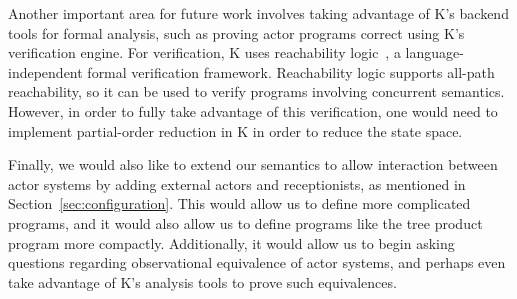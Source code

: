 \documentclass{llncs}
\begin{document}
Another important area for future work involves taking advantage of K's
backend tools for formal analysis, such as proving actor programs correct using
K's verification engine. For verification, K uses reachability logic~\cite{reachabilitylogic}, a
language-independent formal verification framework. Reachability logic supports
all-path reachability, so it can be used to verify programs involving concurrent
semantics. However, in order to fully take advantage of this verification, one
would need to implement partial-order reduction in K in order to reduce the
state space.

Finally, we would also like to extend our semantics to allow interaction between
actor systems by adding external actors and receptionists, as mentioned in
Section~\ref{sec:configuration}. This would allow us to define more complicated
programs, and it would also allow us to define programs like the tree product
program more compactly. Additionally, it would allow us to begin asking
questions regarding observational equivalence of actor systems, and perhaps even
take advantage of K's analysis tools to prove such equivalences.

%
%



\end{document}

